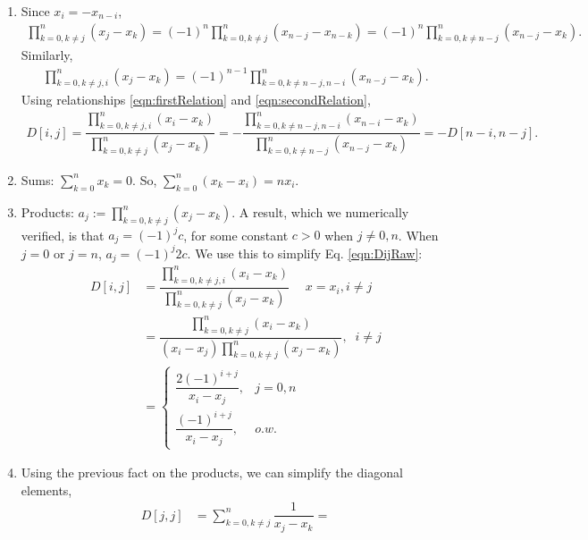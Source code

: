 \documentclass{article}
\begin{document}
\begin{enumerate}
\item Since $x_i = - x_{n-i}$,
\begin{align}
\label{eqn:firstRelation}
\prod_{k=0,k\neq j}^n (x_j - x_k) = 
(-1)^n\prod_{k=0,k\neq j}^n (x_{n-j} - x_{n-k}) 
= (-1)^n \prod_{k=0,k\neq n-j}^n (x_{n-j} - x_k).
\end{align}
Similarly,
\begin{align}
\label{eqn:secondRelation}
\prod_{k=0,k\neq j,i}^n (x_j - x_k) = 
(-1)^{n-1}\prod_{k=0,k\neq n-j,n-i}^n (x_{n-j} - x_k).
\end{align}
Using relationships \ref{eqn:firstRelation} and 
\ref{eqn:secondRelation},
\begin{align}
\label{eqn:combinedRelation}
D[i,j] = \dfrac{\prod_{k=0,k\neq j,i}^n (x_i - x_k)}
{\prod_{k=0,k\neq j}^n (x_j - x_k)}
= -\dfrac{\prod_{k=0,k\neq n-j,n-i}^n (x_{n-i} - x_k)}
{\prod_{k=0,k\neq n-j}^n (x_{n-j} - x_k)} = - D[n-i,n-j].
\end{align}
\item Sums: $\sum_{k=0}^n x_k = 0$. So, $\sum_{k=0}^n (x_k - x_i) 
= n x_i$. 

\item Products: $a_j := 
	\prod_{k=0,k\neq j}^n (x_j - x_k)$. A result, which 
		we numerically verified, is that $a_j = (-1)^j c$, for some 
		constant $c > 0$ when $j \neq 0,n$. When 
		$j = 0$ or $j = n$, $a_j = (-1)^j 2c$. We use this to simplify Eq. \ref{eqn:DijRaw}:
\begin{align}
	D[i,j] &= 
	\dfrac{\prod_{k=0,k\neq j,i}^n (x_i - x_k)}{\prod_{k=0,k\neq j}^n (x_j - x_k)}\; \quad 
	x = x_i, i \neq j  \\
	&= \dfrac{\prod_{k=0,k\neq j}^n (x_i - x_k)}
	{(x_i - x_j)\prod_{k=0,k\neq j}^n (x_j - x_k)}, 
	\; \; i \neq j\\ 
	&= \begin{cases} 
	\dfrac{2 (-1)^{i+j}}{x_i - x_j}, & j = 0, n \\
		\dfrac{(-1)^{i+j}}{x_i - x_j}, & o.w. 
	\end{cases}
\end{align}
\item Using the previous fact on the products, we 
	can simplify the diagonal elements,
\begin{align}
	D[j,j] &= \sum_{k=0,k\neq j}^n 
	\dfrac{1}{x_j - x_k} =  
\end{align}
\end{enumerate}
\end{document}
